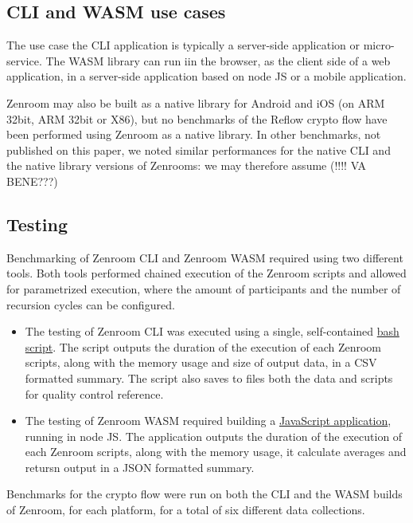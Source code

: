 \documentclass[twocolumn]{article}
\begin{document}
\subsection*{CLI and WASM use cases} 

The use case the CLI application is typically a server-side application or micro-service. The WASM library can run iin the browser, as the client side of a web application, in a server-side application based on node JS or a mobile application.

Zenroom may also be built as a native library for Android and iOS (on ARM 32bit, ARM 32bit or X86), but no benchmarks of the Reflow crypto flow have been performed using Zenroom as a native library. 
In other benchmarks, not published on this paper, we noted similar performances for the native CLI and the native library versions of Zenrooms: we may therefore assume (!!!! VA BENE???)  

\subsection*{Testing}
Benchmarking of Zenroom CLI and Zenroom WASM required using two different tools. Both tools performed chained execution of the Zenroom scripts and allowed for parametrized execution, where the amount of participants and the number of recursion cycles can be configured.  

\begin{itemize}
\item The testing of Zenroom CLI was executed using a single, self-contained \href{https://github.com/dyne/Zenroom/blob/master/test/zencode_reflow/run-recursive.sh}{bash script}. The script outputs the duration of the execution of each Zenroom scripts, along with the memory usage and size of output data, in a CSV formatted summary. The script also saves to files both the data and scripts for quality control reference.

\item The testing of Zenroom WASM required building a \href{https://github.com/dyne/Reflow-Zencode-WASM-benchmark}{JavaScript application}, running in node JS. The application outputs the duration of the execution of each Zenroom scripts, along with the memory usage, it calculate averages and retursn output in a JSON formatted summary.
\end{itemize}

Benchmarks for the crypto flow were run on both the CLI and the WASM builds of Zenroom, for each platform, for a total of six different data collections. 
\end{document}
